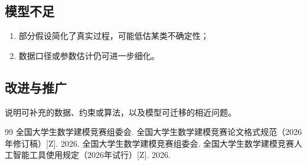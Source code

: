 \documentclass[withoutpreface,bwprint]{cumcmthesis}
\begin{document}
\subsection{模型不足}

\begin{enumerate}
  \item 部分假设简化了真实过程，可能低估某类不确定性；
  \item 数据口径或参数估计仍可进一步细化。
\end{enumerate}

\subsection{改进与推广}

说明可补充的数据、约束或算法，以及模型可迁移的相近问题。

\CumcmAINotUsed

\begin{thebibliography}{99}
  全国大学生数学建模竞赛组委会.
  全国大学生数学建模竞赛论文格式规范（2026年修订稿）[Z].
  2026.
  全国大学生数学建模竞赛组委会.
  全国大学生数学建模竞赛人工智能工具使用规定（2026年试行）[Z].
  2026.
\end{thebibliography}
\end{document}
